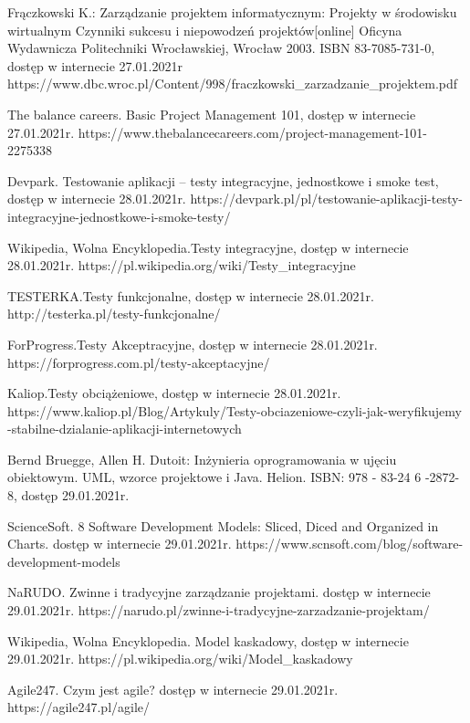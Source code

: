 \documentclass[oneside,polski,logo]{amuthesis}
\begin{document}
\begin{thebibliography}{7}
Frączkowski K.: Zarządzanie projektem informatycznym: 
Projekty w środowisku wirtualnym Czynniki sukcesu i niepowodzeń projektów[online]
Oficyna Wydawnicza Politechniki Wrocławskiej, Wrocław 2003.
ISBN 83-7085-731-0, dostęp w internecie 27.01.2021r
https://www.dbc.wroc.pl/Content/998/fraczkowski\_zarzadzanie\_projektem.pdf

The balance careers. Basic Project Management 101, dostęp w internecie 27.01.2021r.
https://www.thebalancecareers.com/project-management-101-2275338

Devpark. Testowanie aplikacji – testy integracyjne, jednostkowe i smoke test, dostęp w internecie 28.01.2021r.
https://devpark.pl/pl/testowanie-aplikacji-testy-integracyjne-jednostkowe-i-smoke-testy/

Wikipedia, Wolna Encyklopedia.Testy integracyjne, dostęp w internecie 28.01.2021r.
https://pl.wikipedia.org/wiki/Testy\_integracyjne

TESTERKA.Testy funkcjonalne, dostęp w internecie 28.01.2021r.
http://testerka.pl/testy-funkcjonalne/

ForProgress.Testy Akceptracyjne, dostęp w internecie 28.01.2021r.
https://forprogress.com.pl/testy-akceptacyjne/

Kaliop.Testy obciążeniowe, dostęp w internecie 28.01.2021r.
https://www.kaliop.pl/Blog/Artykuly/Testy-obciazeniowe-czyli-jak-weryfikujemy\\-stabilne-dzialanie-aplikacji-internetowych

Bernd Bruegge, Allen H. Dutoit: Inżynieria oprogramowania w ujęciu obiektowym. UML, wzorce projektowe i Java. Helion.
ISBN: 978 - 83-24 6 -2872-8, dostęp 29.01.2021r.

ScienceSoft. 8 Software Development Models: Sliced, Diced and Organized in Charts.  dostęp w internecie 29.01.2021r.
https://www.scnsoft.com/blog/software-development-models

NaRUDO. Zwinne i tradycyjne zarządzanie projektami. dostęp w internecie 29.01.2021r.
https://narudo.pl/zwinne-i-tradycyjne-zarzadzanie-projektam/

Wikipedia, Wolna Encyklopedia. Model kaskadowy, dostęp w internecie 29.01.2021r.
https://pl.wikipedia.org/wiki/Model\_kaskadowy

Agile247. Czym jest agile? dostęp w internecie 29.01.2021r.
https://agile247.pl/agile/


\end{thebibliography}
\end{document}
